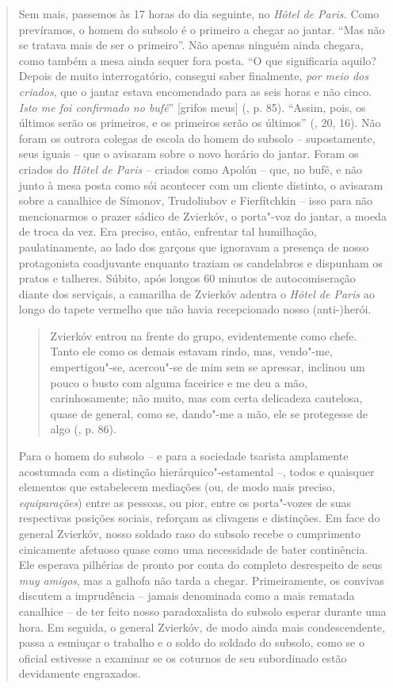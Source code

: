 {\begin{quote}
Sem mais, passemos às 17 horas do dia seguinte, no \emph{Hôtel de
Paris.} Como prevíramos, o homem do subsolo é o primeiro a chegar ao
jantar. ``Mas não se tratava mais de ser o primeiro''. Não apenas
ninguém ainda chegara, como também a mesa ainda sequer fora posta. ``O
que significaria aquilo? Depois de muito interrogatório, consegui saber
finalmente, \emph{por meio dos criados}, que o jantar estava encomendado
para as seis horas e não cinco. \emph{Isto me foi confirmado no bufê}''
{[}grifos meus{]} (, p. 85). ``Assim, pois, os últimos serão os
primeiros, e os primeiros serão os últimos'' (, 20, 16). Não foram
os outrora colegas de escola do homem do subsolo -- supostamente, seus
iguais -- que o avisaram sobre o novo horário do jantar. Foram os
criados do \emph{Hôtel de Paris} -- criados como Apolón -- que, no bufê,
e não junto à mesa posta como sói acontecer com um cliente distinto, o
avisaram sobre a canalhice de Símonov, Trudoliubov e Fierfítchkin --
isso para não mencionarmos o prazer sádico de Zvierkóv, o porta"-voz do
jantar, a moeda de troca da vez. Era preciso, então, enfrentar tal
humilhação, paulatinamente, ao lado dos garçons que ignoravam a presença
de nosso protagonista coadjuvante enquanto traziam os candelabros e
dispunham os pratos e talheres. Súbito, após longos 60 minutos de
autocomiseração diante dos serviçais, a camarilha de Zvierkóv adentra o
\emph{Hôtel de Paris} ao longo do tapete vermelho que não havia
recepcionado nosso (anti-)herói.

\begin{quote}
Zvierkóv entrou na frente do grupo, evidentemente como chefe. Tanto ele
como os demais estavam rindo, mas, vendo"-me, empertigou"-se, acercou"-se
de mim sem se apressar, inclinou um pouco o busto com alguma faceirice e
me deu a mão, carinhosamente; não muito, mas com certa delicadeza
cautelosa, quase de general, como se, dando"-me a mão, ele se protegesse
de algo (, p. 86).
\end{quote}

Para o homem do subsolo -- e para a sociedade tsarista amplamente
acostumada com a distinção hierárquico"-estamental --, todos e quaisquer
elementos que estabelecem mediações (ou, de modo mais preciso,
\emph{equiparações}) entre as pessoas, ou pior, entre os porta"-vozes de
suas respectivas posições sociais, reforçam as clivagens e distinções.
Em face do general Zvierkóv, nosso soldado raso do subsolo recebe o
cumprimento cinicamente afetuoso quase como uma necessidade de bater
continência. Ele esperava pilhérias de pronto por conta do completo
desrespeito de seus \emph{muy amigos}, mas a galhofa não tarda a chegar.
Primeiramente, os convivas discutem a imprudência -- jamais denominada
como a mais rematada canalhice -- de ter feito nosso paradoxalista do
subsolo esperar durante uma hora. Em seguida, o general Zvierkóv, de
modo ainda mais condescendente, passa a esmiuçar o trabalho e o soldo do
soldado do subsolo, como se o oficial estivesse a examinar se os
coturnos de seu subordinado estão devidamente engraxados.


\end{quote}}
